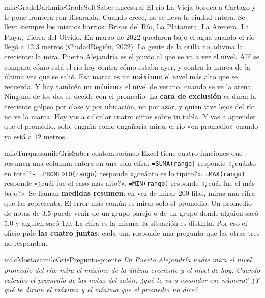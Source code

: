 \documentclass[11pt,letterpaper]{article}
\begin{document}
\begin{softbox}{milcGradeDark}{milcGradeSoft}{Saber ancestral}
El río La Vieja bordea a Cartago y le pone frontera con Risaralda. Cuando crece, no se lleva la ciudad entera. Se lleva siempre los mismos barrios: Brisas del Río, La Platanera, La Arenera, La Playa, Tierra del Olvido. En marzo de 2022 quedaron bajo el agua cuando el río llegó a 12,3 metros (CiudadRegión, 2022). La gente de la orilla no adivina la creciente: la mira. Puerto Alejandría es el punto al que se va a ver el nivel. Allí se compara cómo está el río hoy contra cómo estaba ayer, y contra la marca de la última vez que se salió. Esa marca es un \textbf{máximo}: el nivel más alto que se recuerda. Y hay también un \textbf{mínimo}: el nivel de verano, cuando se ve la arena. Ninguno de los dos se decide con el promedio. La \textbf{cara de exclusión} es dura: la creciente golpea por clase y por ubicación, no por azar, y quien vive lejos del río no ve la marca. Hoy vas a calcular cuatro cifras sobre tu tabla. Y vas a aprender que el promedio, solo, engaña como engañaría mirar el río «en promedio» cuando ya está a 12 metros.\par{}
\end{softbox}

\begin{softbox}{milcTurquesa}{milcGris}{Saber contemporáneo}
Excel tiene cuatro funciones que resumen una columna entera en una sola cifra. \texttt{=SUMA(rango)} responde «¿cuánto en total?». \texttt{=PROMEDIO(rango)} responde «¿cuánto es lo típico?». \texttt{=MAX(rango)} responde «¿cuál fue el caso más alto?». \texttt{=MIN(rango)} responde «¿cuál fue el más bajo?». Se llaman \textbf{medidas resumen}: en vez de mirar 200 filas, miras una cifra que las representa. El error más común es mirar solo el promedio. Un promedio de notas de 3,5 puede venir de un grupo parejo o de un grupo donde alguien sacó 5,0 y alguien sacó 1,0. La cifra es la misma; la situación es distinta. Por eso el oficio pide \textbf{las cuatro juntas}: cada una responde una pregunta que las otras tres no responden.
\end{softbox}

\begin{softbox}{milcMostaza}{milcGris}{Pregunta-puente}
\textit{En Puerto Alejandría nadie mira el nivel promedio del río: mira el máximo de la última creciente y el nivel de hoy. Cuando calcules el promedio de las notas del salón, ¿qué te va a esconder ese número? ¿Y qué te dirían el máximo y el mínimo que el promedio no dice?}
\end{softbox}
\end{document}
